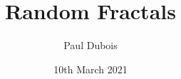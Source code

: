\documentclass{beamer}
\begin{document}
	
	\title{Random Fractals}
	\author{Paul Dubois}
	\date{10th March 2021}
	
	
	\begin{frame}[plain]
	    \titlepage
	\end{frame}
	
\end{document}
